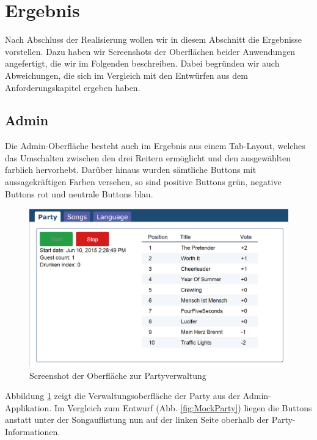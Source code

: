 \newpage
\section{Ergebnis}
Nach Abschluss der Realisierung wollen wir in diesem Abschnitt die Ergebnisse vorstellen. Dazu haben wir Screenshots der Oberflächen beider Anwendungen angefertigt, die wir im Folgenden beschreiben. Dabei begründen wir auch Abweichungen, die sich im Vergleich mit den Entwürfen aus dem Anforderungskapitel ergeben haben.

\subsection{Admin}
Die Admin-Oberfläche besteht auch im Ergebnis aus einem Tab-Layout, welches das Umschalten zwischen den drei Reitern ermöglicht und den ausgewählten farblich hervorhebt. Darüber hinaus wurden sämtliche Buttons mit aussagekräftigen Farben versehen, so sind positive Buttons grün, negative Buttons rot und neutrale Buttons blau.

\begin{figure}[H]
\centering
\includegraphics[width=0.9\linewidth]{Bilder/Screenshot-Admin-Party}
\caption{Screenshot der Oberfläche zur Partyverwaltung}
\label{fig:Screenshot-Admin-Party}
\end{figure}

Abbildung \ref{fig:Screenshot-Admin-Party} zeigt die Verwaltungsoberfläche der Party aus der Admin-Applikation. Im Vergleich zum Entwurf (Abb. \ref{fig:MockParty}) liegen die Buttons anstatt unter der Songauflistung nun auf der linken Seite oberhalb der Party-Informationen.

